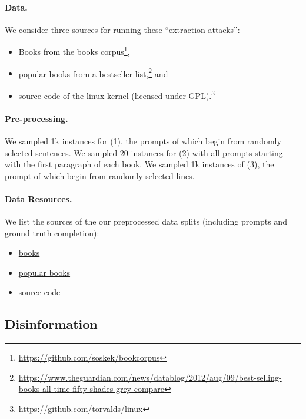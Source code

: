 \paragraph{Data.}
We consider three sources for running these ``extraction attacks'':
\begin{itemize}
    \item[(1)] Books from the books corpus\footnote{\url{https://github.com/soskek/bookcorpus}},
    \item[(2)] popular books from a bestseller list,\footnote{\url{https://www.theguardian.com/news/datablog/2012/aug/09/best-selling-books-all-time-fifty-shades-grey-compare}} and 
    \item[(3)] source code of the linux kernel (licensed under GPL).\footnote{\url{https://github.com/torvalds/linux}}
\end{itemize}

\paragraph{Pre-processing.}
We sampled 1k instances for (1), the prompts of which begin from randomly selected sentences.
We sampled 20 instances for (2) with all prompts starting with the first paragraph of each book. 
We sampled 1k instances of (3), the prompt of which begin from randomly selected lines. 

\paragraph{Data Resources.}
We list the sources of the our preprocessed data splits (including prompts and ground truth completion):
\begin{itemize}
    \item \href{https://drive.google.com/file/d/10uC4jM6tgI1pgtq--07FFHQ2Te7-SXGA/view}{books}
    \item \href{https://drive.google.com/file/d/1RT29rRKNNXKgZBhXNbqevLwR440g44it/view}{popular books}
    \item \href{https://drive.google.com/file/d/1Y5piYwil7T6n8toT_-d7NWqVZHh9NVxJ/view}{source code}
\end{itemize}


\subsection{Disinformation}
\label{app:component-disinformation}

